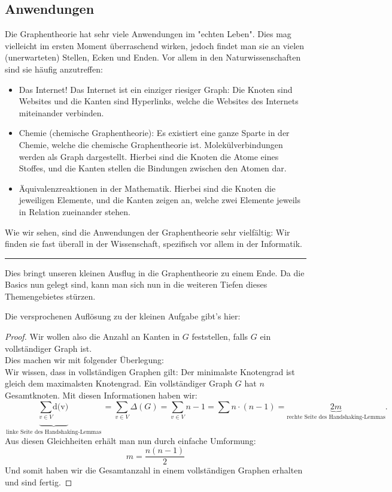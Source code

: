 \documentclass{article}
\theoremstyle{plain}
\begin{document}
\subsection{Anwendungen}
Die Graphentheorie hat sehr viele Anwendungen im "echten Leben". Dies mag vielleicht im ersten Moment überraschend wirken, jedoch findet man sie an vielen (unerwarteten) Stellen, Ecken und Enden. Vor allem in den Naturwissenschaften sind sie häufig anzutreffen:\\
\begin{itemize}
	\item{Das Internet! Das Internet ist ein einziger riesiger Graph: Die Knoten sind Websites und die Kanten sind Hyperlinks, welche die Websites des Internets miteinander verbinden.}
	\item{Chemie (chemische Graphentheorie): Es existiert eine ganze Sparte in der Chemie, welche die chemische Graphentheorie ist. Molekülverbindungen werden als Graph dargestellt. Hierbei sind die Knoten die Atome eines Stoffes, und die Kanten stellen die Bindungen zwischen den Atomen dar.}
	\item{Äquivalenzreaktionen in der Mathematik. Hierbei sind die Knoten die jeweiligen Elemente, und die Kanten zeigen an, welche zwei Elemente jeweils in Relation zueinander stehen.}
\end{itemize}
Wie wir sehen, sind die Anwendungen der Graphentheorie sehr vielfältig: Wir finden sie fast überall in der Wissenschaft, spezifisch vor allem in der Informatik.\\
\hrule
Dies bringt unseren kleinen Ausflug in die Graphentheorie zu einem Ende. Da die Basics nun gelegt sind, kann man sich nun in die weiteren Tiefen dieses Themengebietes stürzen.
\newpage
\begin{small}
	Die versprochenen Auflösung zu der kleinen Aufgabe gibt's hier:\\
	\begin{proof}
		Wir wollen also die Anzahl an Kanten in $G$ feststellen, falls $G$ ein vollständiger Graph ist.\\
		Dies machen wir mit folgender Überlegung:\\
		Wir wissen, dass in vollständigen Graphen gilt: Der minimalste Knotengrad ist gleich dem maximalsten Knotengrad. Ein vollständiger Graph $G$ hat $n$ Gesamtknoten. Mit diesen Informationen haben wir:\\
		\begin{equation*}
			\underbrace{\sum_{v \in V} \text{d(v)}}_{\text{linke Seite des Handshaking-Lemmas}} = \sum_{v \in V}\Delta(G) = \sum_{v \in V} n - 1 = \sum n \cdot (n - 1) = \underbrace{2m}_{\text{rechte Seite des Handshaking-Lemmas}}.
		\end{equation*}
		Aus diesen Gleichheiten erhält man nun durch einfache Umformung:\\
		$$m = \frac{n(n - 1)}{2}$$
		Und somit haben wir die Gesamtanzahl in einem vollständigen Graphen erhalten und sind fertig.
	\end{proof}
\end{small}
\end{document}
